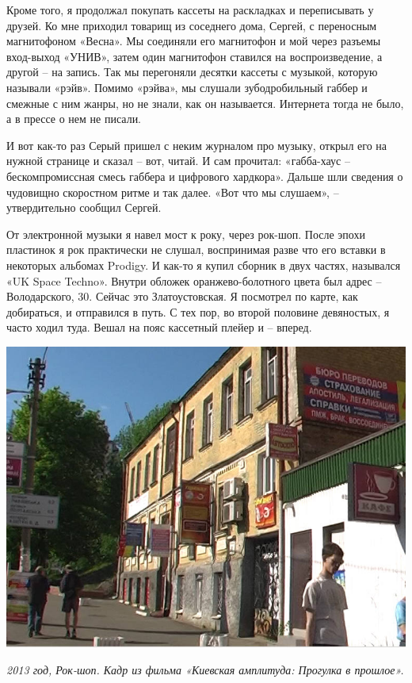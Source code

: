 Кроме того, я продолжал покупать кассеты на раскладках и переписывать у друзей. Ко мне приходил товарищ из соседнего дома, Сергей, с переносным магнитофоном «Весна». Мы соединяли его магнитофон и мой через разъемы вход-выход «УНИВ», затем один магнитофон ставился на воспроизведение, а другой – на запись. Так мы перегоняли десятки кассеты с музыкой, которую называли «рэйв». Помимо «рэйва», мы слушали зубодробильный габбер и смежные с ним жанры, но не знали, как он называется. Интернета тогда не было, а в прессе о нем не писали.

И вот как-то раз Серый пришел с неким журналом про музыку, открыл его на нужной странице и сказал – вот, читай. И сам прочитал: «габба-хаус – бескомпромиссная смесь габбера и цифрового хардкора». Дальше шли сведения о чудовищно скоростном ритме и так далее. «Вот что мы слушаем», – утвердительно сообщил Сергей.

От электронной музыки я навел мост к року, через рок-шоп. После эпохи пластинок я рок практически не слушал, воспринимая разве что его вставки в некоторых альбомах Prodigy. И как-то я купил сборник в двух частях, назывался «UK Space Techno». Внутри обложек оранжево-болотного цвета был адрес – Володарского, 30. Сейчас это Златоустовская. Я посмотрел по карте, как добираться, и отправился в путь. С тех пор, во второй половине девяностых, я часто ходил туда. Вешал на пояс кассетный плейер и – вперед.

\begin{center}
\includegraphics[width=\linewidth]{chast-vosp/musmags/moon-02.jpg}

\textit{2013 год, Рок-шоп. Кадр из фильма «Киевская амплитуда: Прогулка в прошлое».}
\end{center}

